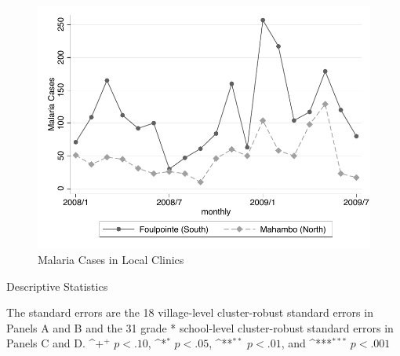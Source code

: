 \documentclass[fleqn,11pt]{article}
\newcommand{\sym}[1]{\rlap{$#1$}}
\def\sym#1{\ifmmode^{#1}\else\(^{#1}\)\fi
}
\begin{document}
\begin{figure}
\centering
\includegraphics[scale=1]{cbsmalariacase.pdf}
\caption{Malaria Cases in Local Clinics}
\label{cbsmalariacase}
\end{figure}




\begin{table}[h]
\caption{Descriptive Statistics}

\begin{adjustbox}{max width=\textwidth}
\begin{threeparttable}
\label{descriptive_merge_child}\centering
\begin{tablenotes}
\item The standard errors are the 18 village-level cluster-robust standard errors in Panels A and B and the 31 grade * school-level cluster-robust standard errors in Panels C and D.  \sym{+} \(p<.10\), \sym{*} \(p<.05\), \sym{**} \(p<.01\), and \sym{***} \(p<.001\)
\end{tablenotes}
\end{threeparttable}
\end{adjustbox}
\end{table}




% 

% 
\end{document}
